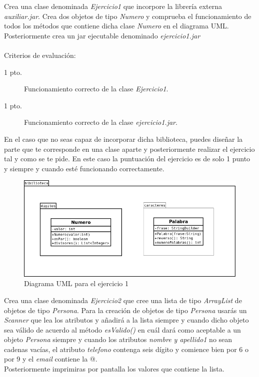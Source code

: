 \documentclass[addpoints,12pt]{exam}
\begin{document}
\begin{questions}
\question Crea una clase denominada \emph{Ejercicio1} que incorpore la librería externa \emph{auxiliar.jar}. Crea dos objetos de tipo \emph{Numero} y comprueba el funcionamiento de todos los métodos que contiene dicha clase \emph{Numero} en el diagrama UML.
\\
Posteriormente crea un jar ejecutable denominado \emph{ejercicio1.jar}\\
\vspace{0.3cm}
\\
Criterios de evaluación:
\begin{description}
\item[1 pto.] Funcionamiento correcto de la clase \emph{Ejercicio1}.
\item[1 pto.] Funcionamiento correcto de la clase \emph{ejercicio1.jar}.
\end{description}
En el caso que no seas capaz de incorporar dicha biblioteca, puedes diseñar la parte que te corresponde en una clase aparte y posteriormente realizar el ejercicio tal y como se te pide. En este caso la puntuación del ejercicio es de solo 1 punto y siempre y cuando esté funcionando correctamente. 
\begin{figure}[h]
\centering
\includegraphics[scale=0.3]{examen.png}
\caption{Diagrama UML para el ejercicio 1}
\end{figure}
\question Crea una clase denominada \emph{Ejercicio2} que cree una lista de tipo \emph{ArrayList} de objetos de tipo \emph{Persona}. Para la creación de objetos de tipo \emph{Persona} usarás un \emph{Scanner} que lea los atributos y añadirá a la lista siempre y cuando dicho objeto sea válido de acuerdo al método \emph{esValido()} en cuál dará como aceptable a un objeto \emph{Persona} siempre y cuando los atributos \emph{nombre y apellido1} no sean cadenas vacías, el atributo \emph{telefono} contenga seis dígito y comience bien por 6 o por 9 y el \emph{email} contiene la @.\\
Posteriormente imprimiras por pantalla los valores que contiene la lista. \\

\end{questions}
\end{document}
